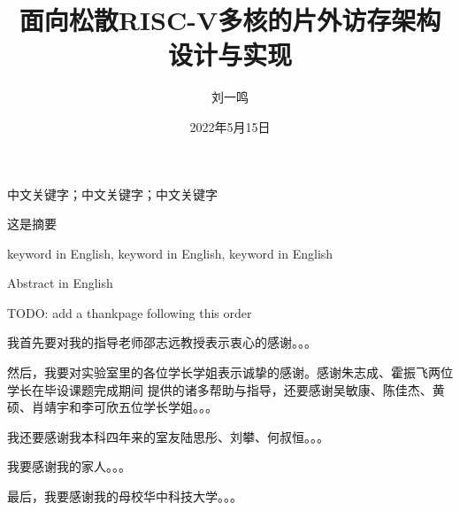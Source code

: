 \documentclass[supercite,notofont]{HustGraduPaper}
\title{面向松散RISC-V多核的片外访存架构设计与实现}
\author{刘一鸣}
\date{2022年5月15日}
\begin{document}


\maketitle

\statement

\clearpage


\begin{cnabstract}{中文关键字；中文关键字；中文关键字}

这是摘要

\end{cnabstract}

\begin{enabstract}{keyword in English, keyword in English, keyword in English}

Abstract in English

\end{enabstract}

\tableofcontents[level=2]

\clearpage




% 
% 
% 
% 

\begin{thankpage}

TODO: add a thankpage following this order

我首先要对我的指导老师邵志远教授表示衷心的感谢。。。

然后，我要对实验室里的各位学长学姐表示诚挚的感谢。感谢朱志成、霍振飞两位学长在毕设课题完成期间
提供的诸多帮助与指导，还要感谢吴敏康、陈佳杰、黄硕、肖靖宇和李可欣五位学长学姐。。。

我还要感谢我本科四年来的室友陆思彤、刘攀、何叔恒。。。

我要感谢我的家人。。。

最后，我要感谢我的母校华中科技大学。。。


\end{thankpage}


\end{document}
